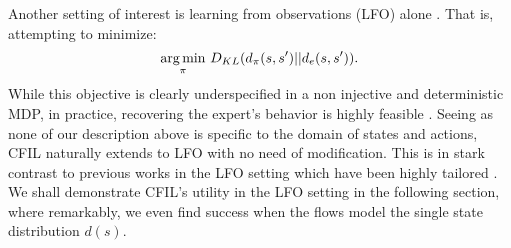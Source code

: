 Another setting of interest is learning from observations (LFO) alone \cite{zhu2020off,torabi2018generative,torabi2021dealio}. That is, attempting to minimize: \begin{equation}
\operatorname*{arg\,min}_{\pi} \, D_{KL}(d_\pi(s,s')||d_e(s,s')).
\end{equation}
While this objective is clearly underspecified in a non injective and deterministic MDP, in practice, recovering the expert's behavior is highly feasible \cite{zhu2020off}.
Seeing as none of our description above is specific to the domain of states and actions, CFIL naturally extends to LFO with no need of modification. This is in stark contrast to previous works in the LFO setting which have been highly tailored \cite{zhu2020off}. We shall demonstrate CFIL's utility in the LFO setting in the following section, where remarkably, we even find success when the flows model the single state distribution $d(s)$.


